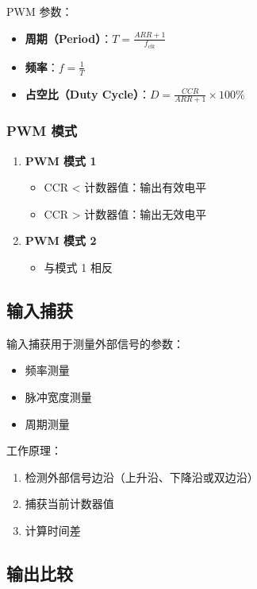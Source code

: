 PWM 参数：
\begin{itemize}
  \item \textbf{周期（Period）}：$T = \frac{ARR + 1}{f_{clk}}$
  \item \textbf{频率}：$f = \frac{1}{T}$
  \item \textbf{占空比（Duty Cycle）}：$D = \frac{CCR}{ARR + 1} \times 100\%$
\end{itemize}

\subsubsection{PWM 模式}

\begin{enumerate}
  \item \textbf{PWM 模式 1}
    \begin{itemize}
      \item CCR < 计数器值：输出有效电平
      \item CCR > 计数器值：输出无效电平
    \end{itemize}

  \item \textbf{PWM 模式 2}
    \begin{itemize}
      \item 与模式 1 相反
    \end{itemize}
\end{enumerate}

\subsection{输入捕获}

输入捕获用于测量外部信号的参数：
\begin{itemize}
  \item 频率测量
  \item 脉冲宽度测量
  \item 周期测量
\end{itemize}

工作原理：
\begin{enumerate}
  \item 检测外部信号边沿（上升沿、下降沿或双边沿）
  \item 捕获当前计数器值
  \item 计算时间差
\end{enumerate}

\subsection{输出比较}

